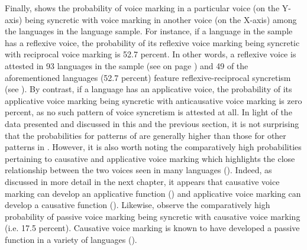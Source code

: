 Finally,  shows the probability of voice marking in a particular voice (on the Y-axis) being syncretic with voice marking in another voice (on the X-axis) among the languages in the language sample. For instance, if a language in the sample has a reflexive voice, the probability of its reflexive voice marking being syncretic with reciprocal voice marking is 52.7 percent. In other words, a reflexive voice is attested in 93 languages in the sample (see  on page \pageref{tab:ch6:voice-frequency}) and 49 of the aforementioned languages (52.7 percent) feature reflexive-reciprocal syncretism (see ). By contrast, if a language has an applicative voice, the probability of its applicative voice marking being syncretic with anticausative voice marking is zero percent, as no such pattern of voice syncretism is attested at all. In light of the data presented and discussed in this and the previous section, it is not surprising that the probabilities for patterns of  are generally higher than those for other patterns in . However, it is also worth noting the comparatively high probabilities pertaining to causative and applicative voice marking which highlights the close relationship between the two voices seen in many languages (). Indeed, as discussed in more detail in the next chapter, it appears that causative voice marking can develop an applicative function () and applicative voice marking can develop a causative function (). Likewise, observe the comparatively high probability of passive voice marking being syncretic with causative voice marking (i.e. 17.5 percent). Causative voice marking is known to have developed a passive function in a variety of languages ().

